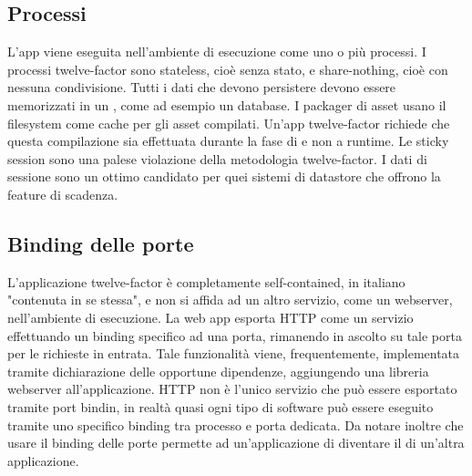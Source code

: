\documentclass[PianoDiQualifica.tex]{subfiles}
\begin{document}
\subsection{Processi}
L'app viene eseguita nell'ambiente di esecuzione come uno o più processi. I processi twelve-factor sono stateless, cioè senza stato, e share-nothing, cioè con nessuna condivisione. Tutti i dati che devono persistere devono essere memorizzati in un , come ad esempio un database.
I packager di asset usano il filesystem come cache per gli asset compilati. Un'app twelve-factor richiede che questa compilazione sia effettuata durante la fase di  e non a runtime.
Le sticky session sono una palese violazione della metodologia twelve-factor. I dati di sessione sono un ottimo candidato per quei sistemi di datastore che offrono la feature di scadenza.

\subsection{Binding delle porte}
L'applicazione twelve-factor è completamente self-contained, in italiano "contenuta in se stessa", e non si affida ad un altro servizio, come un webserver, nell'ambiente di esecuzione. La web app esporta HTTP come un servizio effettuando un binding specifico ad una porta, rimanendo in ascolto su tale porta per le richieste in entrata. Tale funzionalità viene, frequentemente, implementata tramite dichiarazione delle opportune dipendenze, aggiungendo una libreria webserver all'applicazione.
HTTP non è l'unico servizio che può essere esportato tramite port bindin, in realtà quasi ogni tipo di software può essere eseguito tramite uno specifico binding tra processo e porta dedicata.
Da notare inoltre che usare il binding delle porte permette ad un'applicazione di diventare il  di un'altra applicazione.
\end{document}
